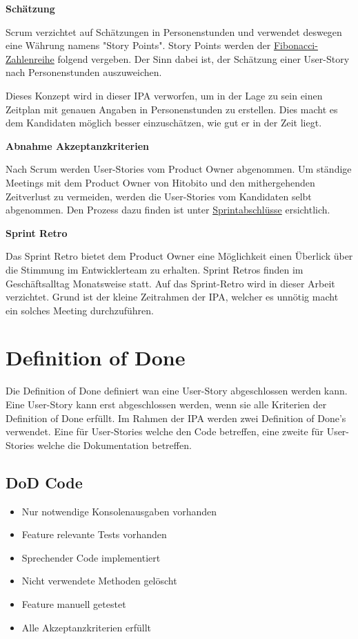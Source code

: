 \textbf{Schätzung}

Scrum verzichtet auf Schätzungen in Personenstunden und verwendet deswegen eine Währung namens "Story Points". Story Points werden
der \href{https://de.wikipedia.org/wiki/Fibonacci-Folge}{Fibonacci-Zahlenreihe} folgend vergeben. Der Sinn dabei ist, der Schätzung einer User-Story 
nach Personenstunden auszuweichen.

Dieses Konzept wird in dieser IPA verworfen, um in der Lage zu sein einen Zeitplan mit genauen Angaben in Personenstunden zu erstellen. Dies macht es dem Kandidaten
möglich besser einzuschätzen, wie gut er in der Zeit liegt.

\textbf{Abnahme Akzeptanzkriterien}

Nach Scrum werden User-Stories vom Product Owner abgenommen. Um ständige Meetings mit dem Product Owner von
Hitobito und den mithergehenden Zeitverlust zu vermeiden, werden die User-Stories vom Kandidaten selbt abgenommen. Den Prozess dazu
finden ist unter \hyperref[sec:sprintfinish]{Sprintabschlüsse} ersichtlich.

\newpage

\textbf{Sprint Retro}

Das Sprint Retro bietet dem Product Owner eine Möglichkeit einen Überlick über die Stimmung im Entwicklerteam zu erhalten. Sprint Retros finden 
im Geschäftsalltag Monatsweise statt. Auf das Sprint-Retro wird
in dieser Arbeit verzichtet. Grund ist der kleine Zeitrahmen der IPA, welcher es unnötig macht ein solches Meeting durchzuführen.

\section{Definition of Done}
\label{dod}
Die Definition of Done definiert wan eine User-Story abgeschlossen werden kann. Eine User-Story kann erst
abgeschlossen werden, wenn sie alle Kriterien der Definition of Done erfüllt. Im Rahmen der IPA werden zwei Definition of Done's verwendet.
Eine für User-Stories welche den Code betreffen, eine zweite für User-Stories welche die Dokumentation betreffen.

\subsection{DoD Code}

\begin{itemize}
    \item Nur notwendige Konsolenausgaben vorhanden
    \item Feature relevante Tests vorhanden
    \item Sprechender Code implementiert
    \item Nicht verwendete Methoden gelöscht
    \item Feature manuell getestet
    \item Alle Akzeptanzkriterien erfüllt
\end{itemize}

